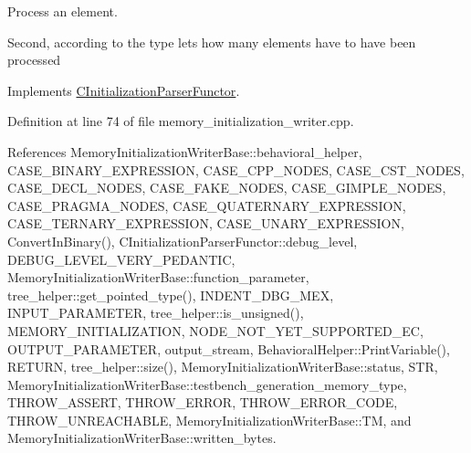 Process an element. 

Second, according to the type let\textquotesingle{}s how many elements have to have been processed 

Implements \hyperlink{classCInitializationParserFunctor_ac84560143f5dcbb961ba1a8f43fea9a1}{C\+Initialization\+Parser\+Functor}.



Definition at line 74 of file memory\+\_\+initialization\+\_\+writer.\+cpp.



References Memory\+Initialization\+Writer\+Base\+::behavioral\+\_\+helper, C\+A\+S\+E\+\_\+\+B\+I\+N\+A\+R\+Y\+\_\+\+E\+X\+P\+R\+E\+S\+S\+I\+ON, C\+A\+S\+E\+\_\+\+C\+P\+P\+\_\+\+N\+O\+D\+ES, C\+A\+S\+E\+\_\+\+C\+S\+T\+\_\+\+N\+O\+D\+ES, C\+A\+S\+E\+\_\+\+D\+E\+C\+L\+\_\+\+N\+O\+D\+ES, C\+A\+S\+E\+\_\+\+F\+A\+K\+E\+\_\+\+N\+O\+D\+ES, C\+A\+S\+E\+\_\+\+G\+I\+M\+P\+L\+E\+\_\+\+N\+O\+D\+ES, C\+A\+S\+E\+\_\+\+P\+R\+A\+G\+M\+A\+\_\+\+N\+O\+D\+ES, C\+A\+S\+E\+\_\+\+Q\+U\+A\+T\+E\+R\+N\+A\+R\+Y\+\_\+\+E\+X\+P\+R\+E\+S\+S\+I\+ON, C\+A\+S\+E\+\_\+\+T\+E\+R\+N\+A\+R\+Y\+\_\+\+E\+X\+P\+R\+E\+S\+S\+I\+ON, C\+A\+S\+E\+\_\+\+U\+N\+A\+R\+Y\+\_\+\+E\+X\+P\+R\+E\+S\+S\+I\+ON, Convert\+In\+Binary(), C\+Initialization\+Parser\+Functor\+::debug\+\_\+level, D\+E\+B\+U\+G\+\_\+\+L\+E\+V\+E\+L\+\_\+\+V\+E\+R\+Y\+\_\+\+P\+E\+D\+A\+N\+T\+IC, Memory\+Initialization\+Writer\+Base\+::function\+\_\+parameter, tree\+\_\+helper\+::get\+\_\+pointed\+\_\+type(), I\+N\+D\+E\+N\+T\+\_\+\+D\+B\+G\+\_\+\+M\+EX, I\+N\+P\+U\+T\+\_\+\+P\+A\+R\+A\+M\+E\+T\+ER, tree\+\_\+helper\+::is\+\_\+unsigned(), M\+E\+M\+O\+R\+Y\+\_\+\+I\+N\+I\+T\+I\+A\+L\+I\+Z\+A\+T\+I\+ON, N\+O\+D\+E\+\_\+\+N\+O\+T\+\_\+\+Y\+E\+T\+\_\+\+S\+U\+P\+P\+O\+R\+T\+E\+D\+\_\+\+EC, O\+U\+T\+P\+U\+T\+\_\+\+P\+A\+R\+A\+M\+E\+T\+ER, output\+\_\+stream, Behavioral\+Helper\+::\+Print\+Variable(), R\+E\+T\+U\+RN, tree\+\_\+helper\+::size(), Memory\+Initialization\+Writer\+Base\+::status, S\+TR, Memory\+Initialization\+Writer\+Base\+::testbench\+\_\+generation\+\_\+memory\+\_\+type, T\+H\+R\+O\+W\+\_\+\+A\+S\+S\+E\+RT, T\+H\+R\+O\+W\+\_\+\+E\+R\+R\+OR, T\+H\+R\+O\+W\+\_\+\+E\+R\+R\+O\+R\+\_\+\+C\+O\+DE, T\+H\+R\+O\+W\+\_\+\+U\+N\+R\+E\+A\+C\+H\+A\+B\+LE, Memory\+Initialization\+Writer\+Base\+::\+TM, and Memory\+Initialization\+Writer\+Base\+::written\+\_\+bytes.

